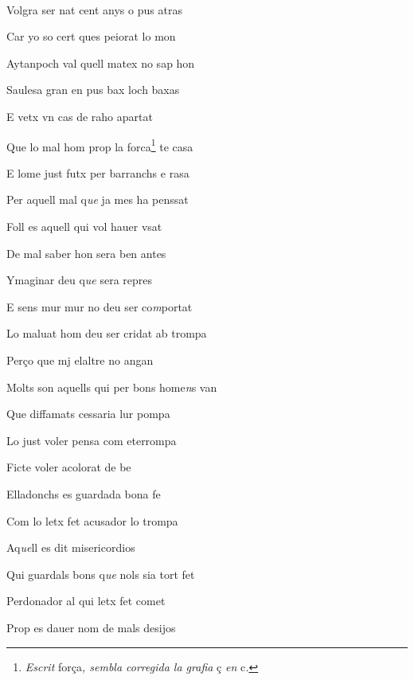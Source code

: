 \documentclass[12pt]{article}
\renewcommand{\espaiAbansEtiquetaPoema}{\vspace{0ex}}
\begin{document}
\begin{estrofa}

\espaiAbansEtiquetaPoema

\\

\end{estrofa}


\begin{estrofa}

 Volgra ser nat cent anys o pus atras

 Car yo so cert ques peiorat lo mon

 Aytanpoch val quell matex no sap hon

 Saulesa gran en pus bax loch baxas

 E vetx vn cas de raho apartat

 Que lo mal hom prop la forca\footnote{\textit{Escrit }for\c{c}a\textit{, sembla
corregida la grafia }\c{c} \textit{en} c\textit{.}}  te casa

 E lome just futx per barranchs e rasa

 Per aquell mal q\textit{ue} ja mes ha penssat

\end{estrofa}



\begin{estrofa}

 Foll es aquell qui vol hauer vsat

 De mal saber hon sera ben antes

 Ymaginar deu q\textit{ue} sera repres

 E sens mur mur no deu ser co\textit{m}portat

 Lo maluat hom deu ser cridat ab trompa

 Per\c{c}o que mj elaltre no angan

 Molts son aquells qui per bons home\textit{n}s van

 Que diffamats cessaria lur pompa

\end{estrofa}



\begin{estrofa}

 Lo just voler pensa com eterrompa

 Ficte voler acolorat de be

 Elladonchs es guardada bona fe

 Com lo letx fet acusador lo trompa

 Aq\textit{ue}ll es dit misericordios

 Qui guardals bons q\textit{ue} nols sia tort fet

 Perdonador al qui letx fet comet

 Prop es dauer nom de mals desijos

\end{estrofa}
\end{document}
